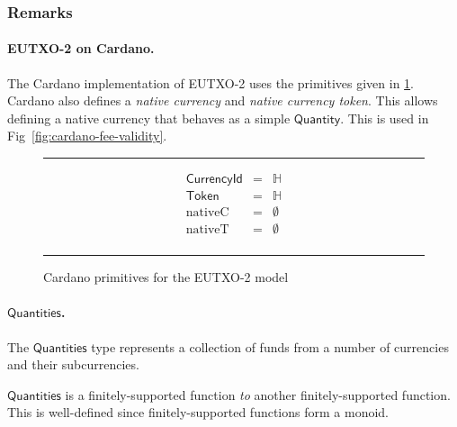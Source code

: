\documentclass[a4paper]{article}
\newcommand{\s}{\textsf}  %
\newcommand\rfskip{7pt}
\newenvironment{ruledfigure}[1]{\begin{figure}[#1]\hrule\vspace{\rfskip}}{\vspace{\rfskip}\hrule\end{figure}}
\newcommand{\qty}{\ensuremath{\s{Quantity}}}
\newcommand{\token}{\ensuremath{\s{Token}}}
\newcommand{\currency}{\ensuremath{\s{CurrencyId}}}
\newcommand{\nativeCur}{\ensuremath{\mathrm{nativeC}}}
\newcommand{\nativeTok}{\ensuremath{\mathrm{nativeT}}}
\newcommand{\qtymap}{\ensuremath{\s{Quantities}}}
\renewcommand\H{\ensuremath{\mathbb{H}}}
\newcommand{\emptyBs}{\ensuremath{\emptyset}}
\begin{document}
\subsubsection{Remarks}
\paragraph{EUTXO-2 on Cardano.}
The Cardano implementation of EUTXO-2 uses the primitives given in
\cref{fig:eutxo-2-types-cardano}.
Cardano also defines a \emph{native currency} and \emph{native currency token}.
This allows defining a native currency that behaves as a simple \qty{}. This
is used in Fig~\ref{fig:cardano-fee-validity}.
\begin{ruledfigure}{H}
  \begin{displaymath}
    \begin{array}{rll}
      \currency  &=& \H\\
      \token     &=& \H\\
      \nativeCur &=& \emptyBs\\
      \nativeTok &=& \emptyBs\\
    \end{array}
  \end{displaymath}
  \caption{Cardano primitives for the EUTXO-2 model}
  \label{fig:eutxo-2-types-cardano}
\end{ruledfigure}

\paragraph{\qtymap{}. }
The \qtymap{} type represents a collection of funds from a
number of currencies and their subcurrencies.

\qtymap{} is a finitely-supported function \emph{to} another finitely-supported
function. This is well-defined since finitely-supported functions form a monoid.
\end{document}
